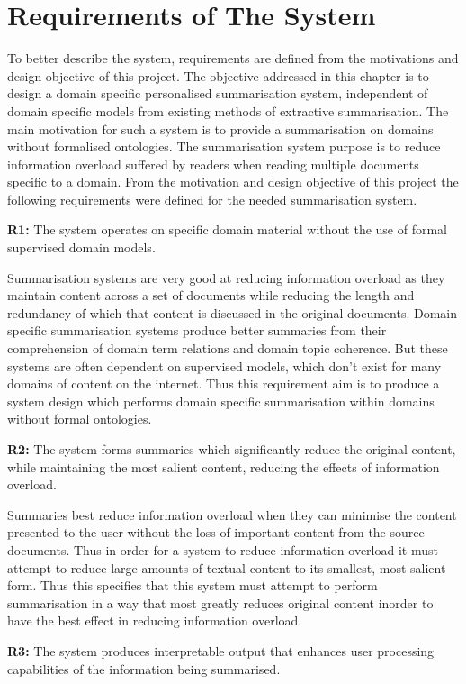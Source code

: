 \section{Requirements of The System}
To better describe the system, requirements are defined from the motivations and design objective of this project. The objective addressed in this chapter is to design a domain specific personalised summarisation system, independent of domain specific models from existing methods of extractive summarisation. The main motivation for such a system is to provide a summarisation on domains without formalised ontologies. The summarisation system purpose is to reduce information overload suffered by readers when reading multiple documents specific to a domain. From the motivation and design objective of this project the following requirements were defined for the needed summarisation system.

\textbf{R1:} The system operates on specific domain material without the use of formal supervised domain models.
\label{r1}

Summarisation systems are very good at reducing information overload as they maintain content across a set of documents while reducing the length and redundancy of which that content is discussed in the original documents. Domain specific summarisation systems produce better summaries from their comprehension of domain term relations and domain topic coherence. But these systems are often dependent on supervised models, which don’t exist for many domains of content on the internet. Thus this requirement aim is to produce a system design which performs domain specific summarisation within domains without formal ontologies. 

\textbf{R2:} The system forms summaries which significantly reduce the original content, while maintaining the most salient content, reducing the effects of information overload.
\label{r2}

Summaries best reduce information overload when they can minimise the content presented to the user without the loss of important content from the source documents. Thus in order for a system to reduce information overload it must attempt to reduce large amounts of textual content to its smallest, most salient form. Thus this specifies that this system must attempt to perform summarisation in a way that most greatly reduces original content inorder to have the best effect in reducing information overload.

\textbf{R3:} The system produces interpretable output that enhances user processing capabilities of the information being summarised.
\label{r3}

